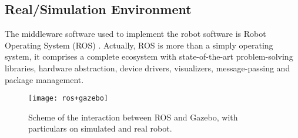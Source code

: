 \subsection{Real/Simulation Environment}
\label{sec:environment}

The middleware software used to implement the robot software is Robot Operating System (ROS) \cite{webros}. Actually, ROS is more than a simply operating system, it comprises a complete ecosystem with state-of-the-art problem-solving libraries, hardware abstraction, device drivers, visualizers, message-passing and package management. 

\begin{figure}[H]
\centerline{\texttt{[image: ros+gazebo]}}
\caption[Scheme of the interaction between ROS and Gazebo.]{Scheme of the interaction between ROS and Gazebo, with particulars on simulated and real robot.}
\label{fig:rosgazebointeraction}
\end{figure}






